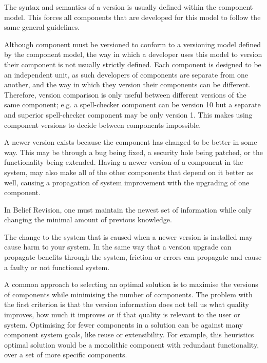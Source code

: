 The syntax and semantics of a version is usually defined within the component model.
This forces all components that are developed for this model to follow the same general guidelines.

Although component must be versioned to conform to a versioning model defined by the component model, 
the way in which a developer uses this model to version their component is not usually strictly defined.
Each component is designed to be an independent unit, as such developers of components are separate from one another,
and the way in which they version their components can be different.
Therefore, version comparison is only useful between different versions of the same component;
e.g. a spell-checker component can be version 10 but a separate and superior spell-checker component may be only version 1.
This makes using component versions to decide between components impossible.

A newer version exists because the component has changed to be better in some way.
This may be through a bug being fixed, a security hole being patched, or the functionality being extended.
Having a newer version of a component in the system, may also make all of the other components that depend on it better as well,
causing a propagation of system improvement with the upgrading of one component.

In Belief Revision, one must maintain the newest set of information while only changing the minimal amount of previous knowledge. 

The change to the system that is caused when a newer version is installed may cause harm to your system.
In the same way that a version upgrade can propagate benefits through the system, 
friction or errors can propagate and cause a faulty or not functional system.

A common approach to selecting an optimal solution is to
maximise the versions of components while minimising the number of components.
The problem with the first criterion is that the version information does not tell us what quality improves, 
how much it improves or if that quality is relevant to the user or system.
Optimising for fewer components in a solution can be against many component system goals, like reuse or extensibility.
For example, this heuristics optimal solution would be a monolithic component with redundant functionality, over 
a set of more specific components. 


